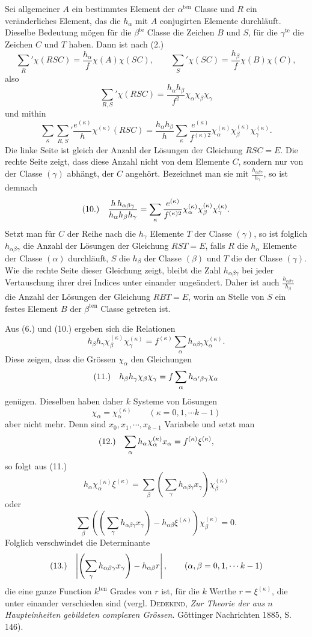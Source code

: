 \documentclass[11pt]{article}
\makeatletter
\newcommand{\frobtagc}[2]{\[\begin{array}{@{}r@{\quad}c@{}}\textup{(#1)} & \displaystyle #2\end{array}\]}
\makeatother
\begin{document}
Sei allgemeiner $A$ ein bestimmtes Element der $\alpha^{\mathrm{ten}}$ Classe und $R$ ein veränderliches Element, das die $h_\alpha$ mit $A$ conjugirten Elemente durchläuft. Dieselbe Bedeutung mögen für die $\beta^{\mathrm{te}}$ Classe die Zeichen $B$ und $S$, für die $\gamma^{\mathrm{te}}$ die Zeichen $C$ und $T$ haben. Dann ist nach (2.)
\[
\sum_R'\chi(RSC)=\frac{h_\alpha}{f}\chi(A)\chi(SC),\qquad \sum_S'\chi(SC)=\frac{h_\beta}{f}\chi(B)\chi(C),
\]
also
\[
\sum_{R,S}'\chi(RSC)=\frac{h_\alpha h_\beta}{f^2}\chi_\alpha\chi_\beta\chi_\gamma
\]
und mithin
\[
\sum_\kappa\sum_{R,S}'\frac{e^{(\kappa)}}{h}\chi^{(\kappa)}(RSC)=\frac{h_\alpha h_\beta}{h}\sum_\kappa\frac{e^{(\kappa)}}{f^{(\kappa)2}}\chi_\alpha^{(\kappa)}\chi_\beta^{(\kappa)}\chi_\gamma^{(\kappa)}.
\]
Die linke Seite ist gleich der Anzahl der Lösungen der Gleichung $RSC=E$. Die rechte Seite zeigt, dass diese Anzahl nicht von dem Elemente $C$, sondern nur von der Classe $(\gamma)$ abhängt, der $C$ angehört. Bezeichnet man sie mit $\frac{h_{\alpha\beta\gamma}}{h_\gamma}$, so ist demnach
\frobtagc{10.}{\frac{h\,h_{\alpha\beta\gamma}}{h_\alpha h_\beta h_\gamma}=\sum_\kappa\frac{e^{(\kappa)}}{f^{(\kappa)2}}\chi_\alpha^{(\kappa)}\chi_\beta^{(\kappa)}\chi_\gamma^{(\kappa)}.}
Setzt man für $C$ der Reihe nach die $h_\gamma$ Elemente $T$ der Classe $(\gamma)$, so ist folglich $h_{\alpha\beta\gamma}$ die Anzahl der Lösungen der Gleichung $RST=E$, falls $R$ die $h_\alpha$ Elemente der Classe $(\alpha)$ durchläuft, $S$ die $h_\beta$ der Classe $(\beta)$ und $T$ die der Classe $(\gamma)$. Wie die rechte Seite dieser Gleichung zeigt, bleibt die Zahl $h_{\alpha\beta\gamma}$ bei jeder Vertauschung ihrer drei Indices unter einander ungeändert. Daher ist auch $\frac{h_{\alpha\beta\gamma}}{h_\beta}$ die Anzahl der Lösungen der Gleichung $RBT=E$, worin an Stelle von $S$ ein festes Element $B$ der $\beta^{\mathrm{ten}}$ Classe getreten ist.

Aus (6.) und (10.) ergeben sich die Relationen
\[
h_\beta h_\gamma\chi_\beta^{(\kappa)}\chi_\gamma^{(\kappa)}=f^{(\kappa)}\sum_\alpha h_{\alpha\beta\gamma}\chi_\alpha^{(\kappa)}.
\]
Diese zeigen, dass die Grössen $\chi_\alpha$ den Gleichungen
\frobtagc{11.}{h_\beta h_\gamma\chi_\beta\chi_\gamma=f\sum_\alpha h_{\alpha'\beta\gamma}\chi_\alpha}
genügen. Dieselben haben daher $k$ Systeme von Lösungen
\[
\chi_\alpha=\chi_\alpha^{(\kappa)}\qquad(\kappa=0,1,\cdots k-1)
\]
aber nicht mehr. Denn sind $x_0,x_1,\cdots,x_{k-1}$ Variabele und setzt man
\frobtagc{12.}{\sum_\alpha h_\alpha\chi_\alpha^{(\kappa)}x_\alpha=f^{(\kappa)}\xi^{(\kappa)},}
so folgt aus (11.)
\[
h_\alpha\chi_\alpha^{(\kappa)}\xi^{(\kappa)}=\sum_\beta\left(\sum_\gamma h_{\alpha\beta\gamma}x_\gamma\right)\chi_\beta^{(\kappa)}
\]
oder
\[
\sum_\beta\left(\left(\sum_\gamma h_{\alpha\beta\gamma}x_\gamma\right)-h_{\alpha\beta}\xi^{(\kappa)}\right)\chi_\beta^{(\kappa)}=0.
\]
Folglich verschwindet die Determinante
\frobtagc{13.}{\left|\left(\sum_\gamma h_{\alpha\beta\gamma}x_\gamma\right)-h_{\alpha\beta}r\right|,\qquad(\alpha,\beta=0,1,\cdots k-1)}
die eine ganze Function $k^{\mathrm{ten}}$ Grades von $r$ ist, für die $k$ Werthe $r=\xi^{(\kappa)}$, die unter einander verschieden sind (vergl. \textsc{Dedekind}, \emph{Zur Theorie der aus $n$ Haupteinheiten gebildeten complexen Grössen}. Göttinger Nachrichten 1885, S. 146).
\end{document}
